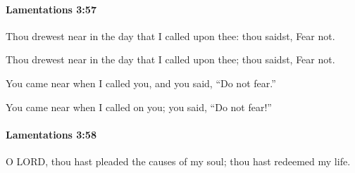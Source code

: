 		\paragraph{Lamentations 3:57} %
			\label{LAMENTATIONS-3-57}

			Thou drewest near in the day that I called upon thee: thou saidst, Fear not.

			\begin{versebox}
					\item[BHS] 
					\item[LXX] 
					\item[ASV] Thou drewest near in the day that I called upon thee; thou saidst, Fear not.
					\item[NIV] You came near when I called you, and you said, “Do not fear.”
					\item[NRSV] You came near when I called on you; you said, “Do not fear!”
			\end{versebox}

		\paragraph{Lamentations 3:58} %
			\label{LAMENTATIONS-3-58}

			O LORD, thou hast pleaded the causes of my soul; thou hast redeemed my life.

